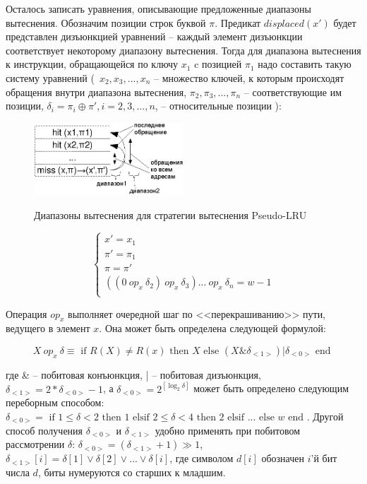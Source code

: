 \documentclass[14pt]{extreport}
\newcommand{\PseudoLRU}{\textsf{Pseudo-LRU}\xspace}
\begin{document}
Осталось записать уравнения, описывающие предложенные диапазоны
вытеснения. Обозначим позиции строк буквой $\pi$. Предикат $displaced(x')$ будет
представлен дизъюнкцией уравнений -- каждый элемент дизъюнкции
соответствует некоторому диапазону вытеснения. Тогда для диапазона
вытеснения к инструкции, обращающейся по ключу $x_1$ c позицией
$\pi_1$ надо составить такую систему уравнений (~$x_2, x_3, ...,
x_n$ -- множество ключей, к которым происходят обращения внутри
диапазона вытеснения, $\pi_2, \pi_3, ..., \pi_n$ -- соответствующие
им позиции, $\delta_i = \pi_i \oplus \pi', i = 2,3,\dots,n$, --
относительные позиции ):

\begin{figure}[h] \center
  \includegraphics[width=0.5\textwidth]{2.theor/plru-ranges}\\
  \caption{Диапазоны вытеснения для стратегии вытеснения \PseudoLRU}
\end{figure}

$$
\left\{
\begin{array}{l}
x' = x_1\\
\pi' = \pi_1\\
\pi = \pi'\\
((0~op_x~\delta_2)~op_x~\delta_3) ... ~op_x~\delta_n  = w-1\\
\end{array}
\right.
$$

Операция $op_x$ выполняет очередной шаг по <<перекрашиванию>> пути,
ведущего в элемент $x$. Она может быть определена следующей формулой:

$$X~op_x~\delta \equiv \mbox{~if~} R(X) \neq R(x) \mbox{~then~} X \mbox{~else~} (X \&
\delta_{<1>}) | \delta_{<0>} \mbox{~end~}$$

где \& -- побитовая конъюнкция, | -- побитовая дизъюнкция,
$\delta_{<1>} = 2 * \delta_{<0>} - 1$, а $\delta_{<0>} = 2^{[\log_2
\delta]}$ может быть определено следующим переборным способом:
$\delta_{<0>} = \mbox{~if~} 1 \leqslant \delta < 2 \mbox{~then~} 1
\mbox{~elsif~} 2 \leqslant \delta < 4 \mbox{~then~} 2 \mbox{~elsif~}
... \mbox{~else~} w \mbox{~end~}$. Другой способ получения
$\delta_{<0>}$ и $\delta_{<1>}$ удобно применять при побитовом
рассмотрении $\delta$: $\delta_{<0>} = (\delta_{<1>} + 1) \gg 1$,
$\delta_{<1>}[i] = \delta[1] \vee \delta[2] \vee ... \vee
\delta[i]$, где символом $d[i]$ обозначен $i$'й бит числа $d$, биты
нумеруются со старших к младшим.
\end{document}
